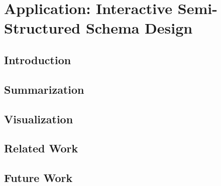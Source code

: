 \chapter{Application: Interactive Semi-Structured Schema Design}
\section{Introduction}
\label{sec:introduction}


\section{Summarization}
\label{sec:distribution}


\section{Visualization}
\label{sec:visualization}


% 

% 

\section{Related Work}
\label{sec:related}


\section{Future Work}
\label{sec:future}

